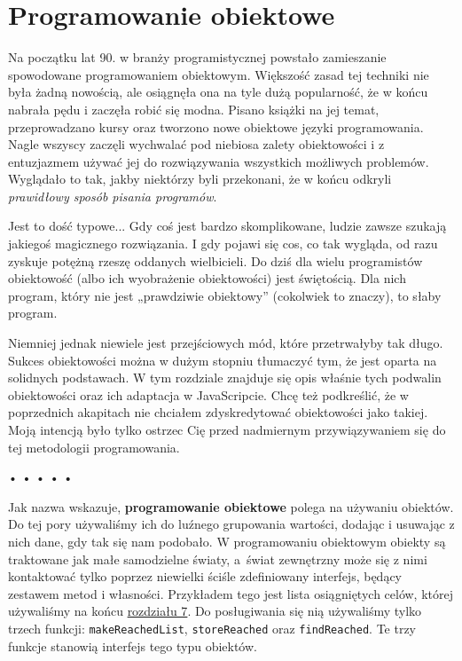 \chapter{Programowanie obiektowe}
\label{chap:8}

Na początku lat 90. w branży programistycznej powstało zamieszanie spowodowane programowaniem obiektowym. Większość zasad tej techniki nie była żadną nowością, ale osiągnęła ona na tyle dużą popularność, że w końcu nabrała pędu i zaczęła robić się modna. Pisano książki na jej temat, przeprowadzano kursy oraz tworzono nowe obiektowe języki programowania. Nagle wszyscy zaczęli wychwalać pod niebiosa zalety obiektowości i z entuzjazmem używać jej do rozwiązywania wszystkich możliwych problemów. Wyglądało to tak, jakby niektórzy byli przekonani, że w końcu odkryli \emph{prawidłowy sposób pisania programów}.

  
Jest to dość typowe... Gdy coś jest bardzo skomplikowane, ludzie zawsze szukają jakiegoś magicznego rozwiązania. I gdy pojawi się cos, co tak wygląda, od razu zyskuje potężną rzeszę oddanych wielbicieli. Do dziś dla wielu programistów obiektowość (albo ich wyobrażenie obiektowości) jest świętością. Dla nich program, który nie jest „prawdziwie obiektowy” (cokolwiek to znaczy), to słaby program. 

  
Niemniej jednak niewiele jest przejściowych mód, które przetrwałyby tak długo. Sukces obiektowości można w dużym stopniu tłumaczyć tym, że jest oparta na solidnych podstawach. W tym rozdziale znajduje się opis właśnie tych podwalin obiektowości oraz ich adaptacja w JavaScripcie. Chcę też podkreślić, że w poprzednich akapitach nie chciałem zdyskredytować obiektowości jako takiej. Moją intencją było tylko ostrzec Cię przed nadmiernym przywiązywaniem się do tej metodologii programowania.



\begin{center}
• • • • •
\end{center}

  
Jak nazwa wskazuje, \textbf{programowanie obiektowe} polega na używaniu obiektów. Do tej pory używaliśmy ich do luźnego grupowania wartości, dodając i usuwając z nich dane, gdy tak się nam podobało. W programowaniu obiektowym obiekty są traktowane jak małe samodzielne światy, a~świat zewnętrzny może się z nimi kontaktować tylko poprzez niewielki ściśle zdefiniowany interfejs, będący zestawem metod i własności. Przykładem tego jest lista osiągniętych celów, której używaliśmy na końcu \hyperref[chap:7]{rozdziału 7}. Do posługiwania się nią używaliśmy tylko trzech funkcji: \texttt{makeReachedList}, \texttt{storeReached} oraz \texttt{findReached}. Te trzy funkcje stanowią interfejs tego typu obiektów.

